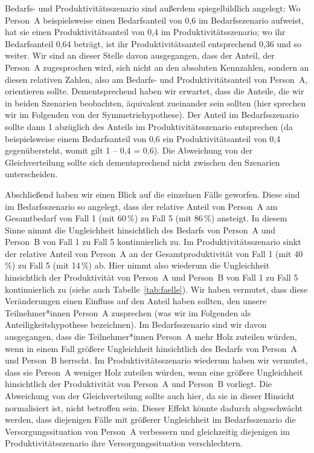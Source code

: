 \documentclass[justified,nobib,symmetric,twoside]{tufte-handout}
\begin{document}
Bedarfs- und Produktivitätsszenario sind außerdem spiegelbildlich angelegt: Wo Person~A beispielsweise einen Bedarfsanteil von 0,6 im Bedarfsszenario aufweist, hat sie einen Produktivitätsanteil von 0,4 im Produktivitätsszenario; wo ihr Bedarfsanteil 0,64 beträgt, ist ihr Produktivitätsanteil entsprechend 0,36 und so weiter.
Wir sind an dieser Stelle davon ausgegangen, dass der Anteil, der Person~A zugesprochen wird, sich nicht an den absoluten Kennzahlen, sondern an diesen relativen Zahlen, also am Bedarfs- und Produktivitätsanteil von Person~A, orientieren sollte.
Dementsprechend haben wir erwartet, dass die Anteile, die wir in beiden Szenarien beobachten, äquivalent zueinander sein sollten (hier sprechen wir im Folgenden von der Symmetriehypothese).
Der Anteil im Bedarfsszenario sollte dann 1 abzüglich des Anteils im Produktivitätsszenario entsprechen (da beispielsweise einem Bedarfsanteil von 0,6 ein Produktivitätsanteil von 0,4 gegenübersteht, womit gilt 1 – 0,4 = 0,6).
Die Abweichung von der Gleichverteilung sollte sich dementsprechend nicht zwischen den Szenarien unterscheiden.

Abschließend haben wir einen Blick auf die einzelnen Fälle geworfen. Diese sind im Bedarfsszenario so angelegt, dass der relative Anteil von Person~A am Gesamtbedarf von Fall 1 (mit 60\,\%) zu Fall 5 (mit 86\,\%) ansteigt.
In diesem Sinne nimmt die Ungleichheit hinsichtlich des Bedarfs von Person~A und Person~B von Fall 1 zu Fall 5 kontinuierlich zu.
Im Produktivitätsszenario sinkt der relative Anteil von Person~A an der Gesamtproduktivität von Fall 1 (mit 40\,\%) zu Fall 5 (mit 14\,\%) ab.
Hier nimmt also wiederum die Ungleichheit hinsichtlich der Produktivität von Person~A und Person~B von Fall 1 zu Fall 5 kontinuierlich zu (siehe auch Tabelle~\ref{tab:faelle}).
Wir haben vermutet, dass diese Veränderungen einen Einfluss auf den Anteil haben sollten, den unsere Teilnehmer*innen Person~A zusprechen (was wir im Folgenden als Anteiligkeitshypothese bezeichnen).
Im Bedarfsszenario sind wir davon ausgegangen, dass die Teilnehmer*innen Person~A mehr Holz zuteilen würden, wenn in einem Fall größere Ungleichheit hinsichtlich des Bedarfs von Person~A und Person~B herrscht.
Im Produktivitätsszenario wiederum haben wir vermutet, dass sie Person~A weniger Holz zuteilen würden, wenn eine größere Ungleichheit hinsichtlich der Produktivität von Person~A und Person~B vorliegt.
Die Abweichung von der Gleichverteilung sollte auch hier, da sie in dieser Hinsicht normalisiert ist, nicht betroffen sein.
Dieser Effekt könnte dadurch abgeschwächt werden, dass diejenigen Fälle mit größerer Ungleichheit im Bedarfsszenario die Versorgungssituation von Person~A verbessern und gleichzeitig diejenigen im Produktivitätsszenario ihre Versorgungssituation verschlechtern.
\end{document}
